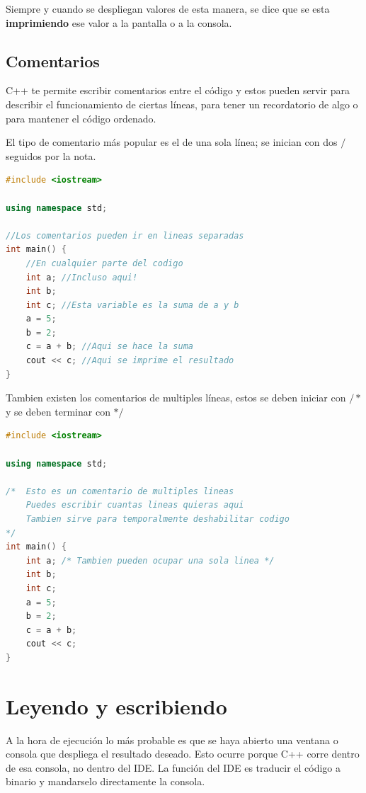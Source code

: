 \documentclass{article}
\begin{document}
Siempre y cuando se despliegan valores de esta manera, se dice que se esta \textbf{imprimiendo} ese valor a la pantalla o a la consola.

\subsection{Comentarios}

C++ te permite escribir comentarios entre el código y estos pueden servir para describir el funcionamiento de ciertas líneas, para tener un recordatorio de algo o para mantener el código ordenado.

El tipo de comentario más popular es el de una sola línea; se inician con dos $/$ seguidos por la nota.

\begin{lstlisting}[language=C++, title=Comentario]
#include <iostream>

using namespace std;

//Los comentarios pueden ir en lineas separadas
int main() {
	//En cualquier parte del codigo
	int a; //Incluso aqui!
	int b;
	int c; //Esta variable es la suma de a y b
	a = 5;
	b = 2;
	c = a + b; //Aqui se hace la suma
	cout << c; //Aqui se imprime el resultado
}
\end{lstlisting}

Tambien existen los comentarios de multiples líneas, estos se deben iniciar con $/*$ y se deben terminar con $*/$

\begin{lstlisting}[language=C++, title=Comentario]
#include <iostream>

using namespace std;

/*  Esto es un comentario de multiples lineas
    Puedes escribir cuantas lineas quieras aqui
    Tambien sirve para temporalmente deshabilitar codigo
*/
int main() {
	int a; /* Tambien pueden ocupar una sola linea */
	int b;
	int c;
	a = 5;
	b = 2;
	c = a + b;
	cout << c;
}
\end{lstlisting}

\section{Leyendo y escribiendo}

A la hora de ejecución lo más probable es que se haya abierto una ventana o consola que despliega el resultado deseado. Esto ocurre porque C++ corre dentro de esa consola, no dentro del IDE. La función del IDE es traducir el código a binario y mandarselo directamente la consola.
\end{document}
